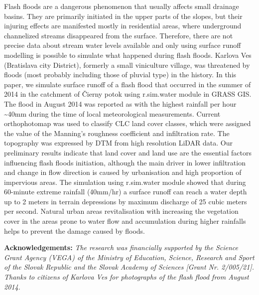 {Flash floods are a dangerous phenomenon that usually affects small drainage basins. They are primarily initiated in the upper parts of the slopes, but their injuring effects are manifested mostly in residential areas, where underground channelized streams disappeared from the surface. Therefore, there are not precise data about stream water levels available and only using surface runoff modelling is possible to simulate what happened during flash floods. Karlova Ves (Bratislava city District), formerly a small viniculture village, was threatened by floods (most probably including those of pluvial type) in the history. In this paper, we simulate surface runoff of a flash flood that occurred in the summer of 2014 in the catchment of Čierny potok using r.sim.water module in GRASS GIS. The flood in August 2014 was reported as with the highest rainfall per hour \textasciitilde40mm during the time of local meteorological measurements. Current orthophotomap was used to classify CLC land cover classes, which were assigned the value of the Manning’s roughness coefficient and infiltration rate. The topography was expressed by DTM from high resolution LiDAR data. Our preliminary results indicate that land cover and land use are the essential factors influencing flash floods initiation, although the main driver in lower infiltration and change in flow direction is caused by urbanisation and high proportion of impervious areas. The simulation using r.sim.water module showed that during 60-minute extreme rainfall (40mm/hr) a surface runoff can reach a water depth up to 2 meters in terrain depressions by maximum discharge of 25 cubic meters per second. Natural urban areas revitalisation with increasing the vegetation cover in the areas prone to water flow and accumulation during higher rainfalls helps to prevent the damage caused by floods.

\vspace{0.5em}
\noindent
\textbf{Acknowledgements:}
\textit{The research was financially supported by the Science Grant Agency (VEGA) of the Ministry of Education, Science, Research and Sport of the Slovak Republic and the Slovak Academy of Sciences [Grant Nr. 2/005/21]. Thanks to citizens of Karlova Ves for photographs of the flash flood from August 2014.}}%
